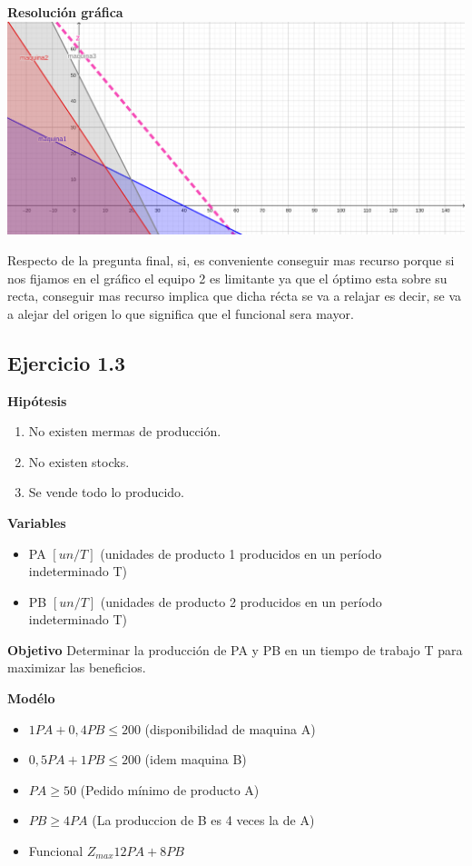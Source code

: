\documentclass[12pt]{book}
\begin{document}
\begin{center}
\textbf{Resoluci\'on gr\'afica}
\includegraphics[scale=.1]{./img/geogebra-export.png}
\end{center}
Respecto de la pregunta final, si, es conveniente conseguir mas recurso porque si nos fijamos en el gráfico el equipo 2 es limitante ya que el óptimo esta sobre su recta, conseguir mas recurso implica que dicha récta se va a relajar es decir, se va a alejar del origen lo que significa que el funcional sera mayor.





\subsection{Ejercicio 1.3}
\textbf{Hipótesis}
\begin{enumerate} 
\item No existen mermas de producción.
\item No existen stocks.
\item Se vende todo lo producido.
\end{enumerate}

\textbf{Variables}
\begin{itemize}
\item PA $[un/T]$ (unidades de producto 1 producidos en un período indeterminado T)
\item PB $[un/T]$ (unidades de producto 2 producidos en un período indeterminado T)
\end{itemize}

\textbf{Objetivo}
Determinar la producción de PA y PB en un tiempo de trabajo T para maximizar las beneficios.

\textbf{Modélo}
\begin{itemize}
\item $1 PA + 0,4 PB \leq 200 $ (disponibilidad de maquina A)
\item $0,5 PA + 1 PB \leq 200 $ (idem maquina B)
\item $ PA \geq 50 $ (Pedido mínimo de producto A)
\item $ PB \geq 4 PA $ (La produccion de B es 4 veces la de A)
\item Funcional $ Z_{max} 12 PA + 8 PB $ 
\end{itemize}
\end{document}
